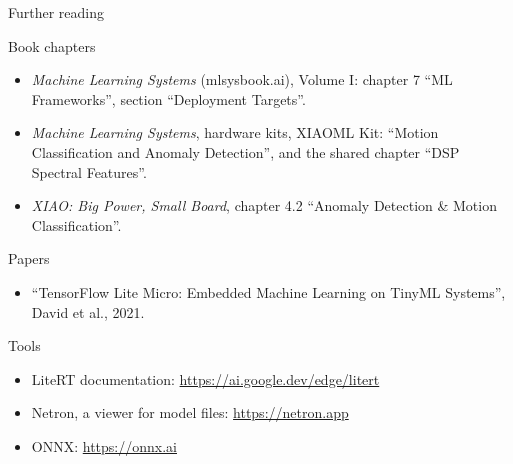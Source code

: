 \begin{frame}{Further reading}
  \footnotesize
  \begin{block}{Book chapters}
    \begin{itemize}
      \item \emph{Machine Learning Systems} (mlsysbook.ai), Volume I: chapter
            7 ``ML Frameworks'', section ``Deployment Targets''.
      \item \emph{Machine Learning Systems}, hardware kits, XIAOML Kit:
            ``Motion Classification and Anomaly Detection'', and the shared
            chapter ``DSP Spectral Features''.
      \item \emph{XIAO: Big Power, Small Board}, chapter 4.2 ``Anomaly
            Detection \& Motion Classification''.
    \end{itemize}
  \end{block}
  \begin{block}{Papers}
    \begin{itemize}
      \item ``TensorFlow Lite Micro: Embedded Machine Learning on TinyML
            Systems'', David et al., 2021.
    \end{itemize}
  \end{block}
  \begin{block}{Tools}
    \begin{itemize}
      \item LiteRT documentation: \url{https://ai.google.dev/edge/litert}
      \item Netron, a viewer for model files: \url{https://netron.app}
      \item ONNX: \url{https://onnx.ai}
    \end{itemize}
  \end{block}
\end{frame}
